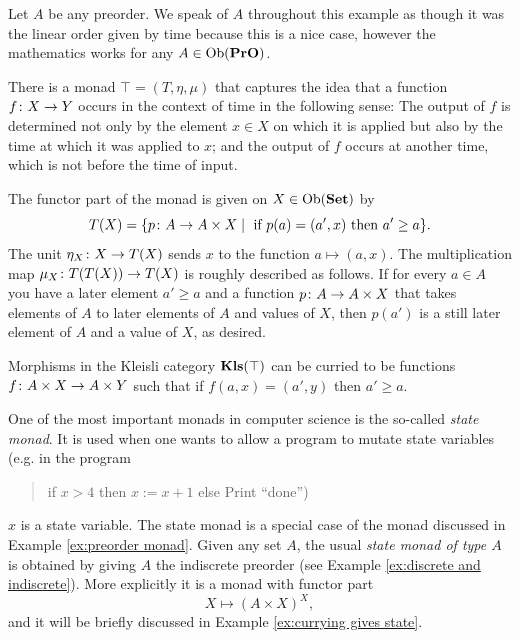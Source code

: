 \documentclass[CT4S-EN-RU]{subfiles}
\begin{document}
\begin{exampleENG}\label{ex:preorder monad}
Let $A$ be any preorder. We speak of $A$ throughout this example as though it was the linear order given by time because this is a nice case, however the mathematics works for any $A\in\textnormal{Ob}({\mathbf{PrO}})$. 

There is a monad $\top=(T,\eta,\mu)$ that captures the idea that a function $f\colon X\rightarrow Y$ occurs in the context of time in the following sense: The output of $f$ is determined not only by the element $x\in X$ on which it is applied but also by the time at which it was applied to $x$; and the output of $f$ occurs at another time, which is not before the time of input.

The functor part of the monad is given on $X\in\textnormal{Ob}({\mathbf{Set}})$ by
$$T(X)=\{p\colon A\rightarrow A\times X{\;|\;}\textnormal{ if } p(a)=(a',x)\textnormal{ then } a'\geq a\}.$$
The unit $\eta_X\colon X\rightarrow T(X)$ sends $x$ to the function $a\mapsto (a,x)$. The multiplication map $\mu_X\colon T(T(X))\rightarrow T(X)$ is roughly described as follows. If for every $a\in A$ you have a later element $a'\geq a$ and a function $p\colon A\rightarrow A\times X$ that takes elements of $A$ to later elements of $A$ and values of $X$, then $p(a')$ is a still later element of $A$ and a value of $X$, as desired.

Morphisms in the Kleisli category ${\mathbf{Kls}}(\top)$ can be curried to be functions $f\colon A\times X\rightarrow A\times Y$ such that if $f(a,x)=(a',y)$ then $a'\geq a$. 
\end{exampleENG}

\begin{exampleRUS}\label{ex:preorder monad}
\end{exampleRUS}

\begin{remarkENG}\label{rem:state monad}
One of the most important monads in computer science is the so-called {\em state monad}. It is used when one wants to allow a program to mutate state variables (e.g. in the program 
\begin{quote}if $x>4$ then $x:=x+1$ else Print “done”)\end{quote}
$x$ is a state variable. The state monad is a special case of the monad discussed in Example \ref{ex:preorder monad}. Given any set $A$, the usual {\em state monad of type $A$} is obtained by giving $A$ the indiscrete preorder (see Example \ref{ex:discrete and indiscrete}). More explicitly it is a monad with functor part $$X\mapsto (A\times X)^X,$$ and it will be briefly discussed in Example \ref{ex:currying gives state}.
\end{remarkENG}
\end{document}
